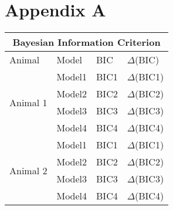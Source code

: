 \chapter{Appendix A}
\begin{table}[h!]
    \centering
\begin{tabular}{ |p{3cm}||p{3cm}|p{2cm}|p{2cm}| }
 \hline
 \multicolumn{4}{|c|}{Bayesian Information Criterion} \\
 \hline
 Animal & Model & BIC & $\Delta$(BIC)\\
 \hline
\multirow{4}{6cm}{Animal 1} &Model1&BIC1&$\Delta$(BIC1)\\&Model2&BIC2&$\Delta$(BIC2)\\&Model3&BIC3&$\Delta$(BIC3)\\&Model4&BIC4&$\Delta$(BIC4)\\
\hline
\multirow{4}{6cm}{Animal 2} &Model1&BIC1&$\Delta$(BIC1)\\&Model2&BIC2&$\Delta$(BIC2)\\&Model3&BIC3&$\Delta$(BIC3)\\&Model4&BIC4&$\Delta$(BIC4)\\
 \hline
\end{tabular}
\end{table}